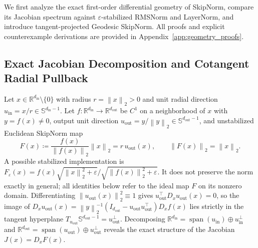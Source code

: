 \documentclass[10pt]{article}
\theoremstyle{definition}
\theoremstyle{remark}
\newcommand{\R}{\mathbb{R}}
\newcommand{\Sp}{\mathbb{S}}
\newcommand{\norm}[1]{\left\lVert #1 \right\rVert}
\begin{document}
We first analyze the exact first-order differential geometry of SkipNorm, compare its Jacobian spectrum against $\varepsilon$-stabilized RMSNorm and LayerNorm, and introduce tangent-projected Geodesic SkipNorm. All proofs and explicit counterexample derivations are provided in Appendix~\ref{app:geometry_proofs}.

\subsection{Exact Jacobian Decomposition and Cotangent Radial Pullback}

Let $x \in \R^{d_{\mathrm{in}}} \setminus \{0\}$ with radius $r = \norm{x}_2 > 0$ and unit radial direction $u_{\mathrm{in}} = x / r \in \Sp^{d_{\mathrm{in}}-1}$. Let $f: \R^{d_{\mathrm{in}}} \to \R^{d_{\mathrm{out}}}$ be $C^1$ on a neighborhood of $x$ with $y = f(x) \neq 0$, output unit direction $u_{\mathrm{out}} = y / \norm{y}_2 \in \Sp^{d_{\mathrm{out}}-1}$, and unstabilized Euclidean SkipNorm map
\begin{equation}
    F(x) \coloneqq \frac{f(x)}{\norm{f(x)}_2} \norm{x}_2 = r \, u_{\mathrm{out}}(x), \qquad \norm{F(x)}_2 = \norm{x}_2.
    \label{eq:skipnorm_l2}
\end{equation}
A possible stabilized implementation is $F_\varepsilon(x) = f(x) \sqrt{\norm{x}_2^2 + \varepsilon} / \sqrt{\norm{f(x)}_2^2 + \varepsilon}$. It does not preserve the norm exactly in general; all identities below refer to the ideal map $F$ on its nonzero domain. Differentiating $\norm{u_{\mathrm{out}}(x)}_2^2 \equiv 1$ gives $u_{\mathrm{out}}^\top D_x u_{\mathrm{out}}(x) = 0$, so the image of $D_x u_{\mathrm{out}}(x) = \norm{y}_2^{-1}(I_{d_{\mathrm{out}}} - u_{\mathrm{out}} u_{\mathrm{out}}^\top) D_x f(x)$ lies strictly in the tangent hyperplane $T_{u_{\mathrm{out}}} \Sp^{d_{\mathrm{out}}-1} = u_{\mathrm{out}}^\perp$. Decomposing $\R^{d_{\mathrm{in}}} = \operatorname{span}(u_{\mathrm{in}}) \oplus u_{\mathrm{in}}^\perp$ and $\R^{d_{\mathrm{out}}} = \operatorname{span}(u_{\mathrm{out}}) \oplus u_{\mathrm{out}}^\perp$ reveals the exact structure of the Jacobian $J(x) = D_x F(x)$.
\end{document}
